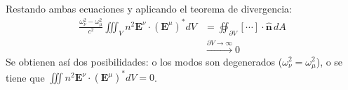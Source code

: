 Restando ambas ecuaciones y aplicando el teorema de divergencia:
\begin{align*}
	\frac{\omega_\nu^2 - \omega_\mu^2}{c^2} \iiint_V n^2 \textbf{E}^\nu \cdot \left(\textbf{E}^\mu\right)^* dV &= \oiint_{\partial V} \left[ \cdots \right] \cdot \hat{\textbf{n}}\,dA \\
	&\xrightarrow{\partial V \to \infty} 0
\end{align*}
Se obtienen así dos posibilidades: o los modos son degenerados ($\omega_\nu^2 = \omega_\mu^2$), o se tiene que $\iiint n^2 \textbf{E}^\nu \cdot \left(\textbf{E}^\mu\right)^* dV = 0$.